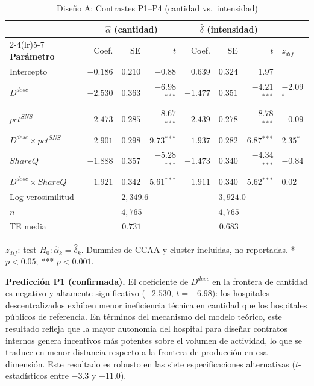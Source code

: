 \documentclass[12pt, a4paper, twoside, openright]{book}
\newcommand{\sig}[1]{\ensuremath{^{#1}}}
\theoremstyle{plain}
\theoremstyle{definition}
\theoremstyle{remark}
\begin{document}
\begin{table}[htbp]
\centering
\caption{Diseño A: Contrastes P1--P4 (cantidad vs.\ intensidad)}
\label{tab:disA}
\begin{threeparttable}
\begin{tabular}{lrrrrrrl}
\toprule
& \multicolumn{3}{c}{\textbf{$\hat{\alpha}$ (cantidad)}}
& \multicolumn{3}{c}{\textbf{$\hat{\delta}$ (intensidad)}} & \\
\cmidrule(lr){2-4}\cmidrule(lr){5-7}
\textbf{Parámetro} & Coef. & SE & $t$
  & Coef. & SE & $t$ & \textbf{$z_{dif}$} \\
\midrule
Intercepto
  & $-0.186$ & $0.210$ & $-0.88$
  & $0.639$  & $0.324$ & $1.97$ & \\
$D^{desc}$
  & $-2.530$ & $0.363$ & $-6.98$\sig{***}
  & $-1.477$ & $0.351$ & $-4.21$\sig{***}
  & $-2.09$\sig{*} \\
$pct^{SNS}$
  & $-2.473$ & $0.285$ & $-8.67$\sig{***}
  & $-2.439$ & $0.278$ & $-8.78$\sig{***}
  & $-0.09$ \\
$D^{desc} \times pct^{SNS}$
  & $2.901$  & $0.298$ & $9.73$\sig{***}
  & $1.937$  & $0.282$ & $6.87$\sig{***}
  & $2.35$\sig{*} \\
$ShareQ$
  & $-1.888$ & $0.357$ & $-5.28$\sig{***}
  & $-1.473$ & $0.340$ & $-4.34$\sig{***}
  & $-0.84$ \\
$D^{desc} \times ShareQ$
  & $1.921$  & $0.342$ & $5.61$\sig{***}
  & $1.911$  & $0.340$ & $5.62$\sig{***}
  & $0.02$ \\
\midrule
Log-verosimilitud & \multicolumn{3}{c}{$-2{,}349.6$}
  & \multicolumn{3}{c}{$-3{,}924.0$} & \\
$n$ & \multicolumn{3}{c}{$4{,}765$}
  & \multicolumn{3}{c}{$4{,}765$} & \\
TE media & \multicolumn{3}{c}{$0.731$}
  & \multicolumn{3}{c}{$0.683$} & \\
\bottomrule
\end{tabular}
\begin{tablenotes}
  \small
  \item $z_{dif}$: test $H_0: \hat{\alpha}_k = \hat{\delta}_k$. Dummies de CCAA y cluster incluidas, no reportadas. * $p<0.05$; *** $p<0.001$.
\end{tablenotes}
\end{threeparttable}
\end{table}

\textbf{Predicción P1 (confirmada).} El coeficiente de $D^{desc}$ en la frontera de cantidad es negativo y altamente significativo ($-2.530$, $t=-6.98$): los hospitales descentralizados exhiben menor ineficiencia técnica en cantidad que los hospitales públicos de referencia. En términos del mecanismo del modelo teórico, este resultado refleja que la mayor autonomía del hospital para diseñar contratos internos genera incentivos más potentes sobre el volumen de actividad, lo que se traduce en menor distancia respecto a la frontera de producción en esa dimensión. Este resultado es robusto en las siete especificaciones alternativas ($t$-estadísticos entre $-3.3$ y $-11.0$).
\end{document}

